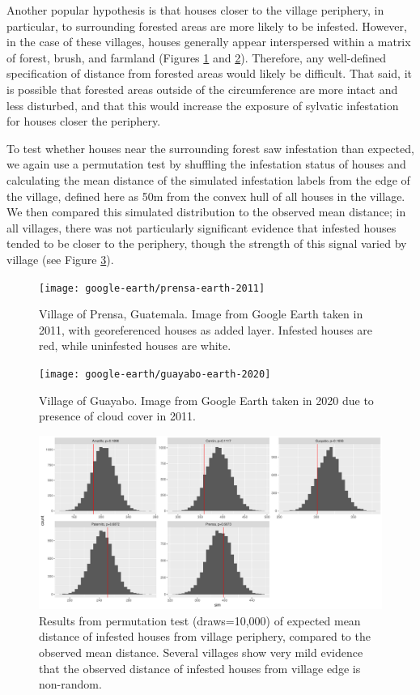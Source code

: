 \documentclass{scrartcl}
\begin{document}
Another popular hypothesis is that houses closer to the village
periphery, in particular, to surrounding forested areas are more
likely to be infested. However, in the case of these villages, houses
generally appear interspersed within a matrix of forest, brush, and
farmland (Figures \ref{fig:prensa-earth-2011} and
\ref{fig:guayabo-earth-2020}). Therefore, any well-defined
specification of distance from forested areas would likely be
difficult. That said, it is possible that forested areas outside of
the circumference are more intact and less disturbed, and that this
would increase the exposure of sylvatic infestation for houses closer
the periphery.

To test whether houses near the surrounding forest saw infestation
than expected, we again use a permutation test by shuffling the
infestation status of houses and calculating the mean distance of the
simulated infestation labels from the edge of the village, defined
here as 50m from the convex hull of all houses in the village. We then
compared this simulated distribution to the observed mean distance; in
all villages, there was not particularly significant evidence that
infested houses tended to be closer to the periphery, though the
strength of this signal varied by village (see Figure
\ref{fig:perimeter-test}).

\begin{figure}
  \centering
  \texttt{[image: google-earth/prensa-earth-2011]}
  \caption{Village of Prensa, Guatemala. Image from Google Earth
    taken in 2011, with georeferenced houses as added layer. Infested
    houses are red, while uninfested houses are white.}
  \label{fig:prensa-earth-2011}
\end{figure}

\begin{figure}
  \centering
  \texttt{[image: google-earth/guayabo-earth-2020]}
  \caption{Village of Guayabo. Image from Google Earth
    taken in 2020 due to presence of cloud cover in 2011.}
  \label{fig:guayabo-earth-2020}
\end{figure}

\begin{figure}
  \centering
  \includegraphics[width=.7\linewidth]{perimeter-test}
  \caption{Results from permutation test (draws=10,000) of expected
    mean distance of infested houses from village periphery, compared
    to the observed mean distance. Several villages show very mild
    evidence that the observed distance of infested houses from
    village edge is non-random.}
  \label{fig:perimeter-test}
\end{figure}
\end{document}
